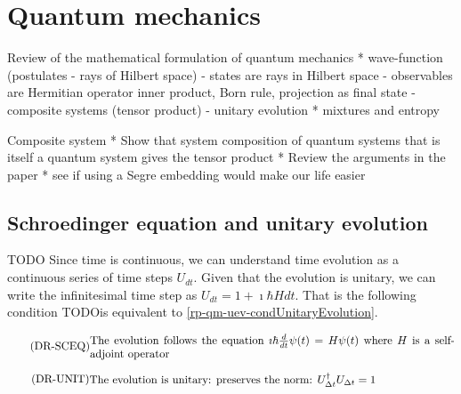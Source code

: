 

\def\>{\rangle}
\def\<{\langle}


\chapter{Quantum mechanics}


Review of the mathematical formulation of quantum mechanics
* wave-function (postulates - rays of Hilbert space)
- states are rays in Hilbert space
- observables are Hermitian operator inner product, Born rule, projection as final state
- composite systems (tensor product)
- unitary evolution
* mixtures and entropy

Composite system
* Show that system composition of quantum systems that is itself a quantum system gives the tensor product
* Review the arguments in the paper
* see if using a Segre embedding would make our life easier

\section{Schroedinger equation and unitary evolution}

TODO Since time is continuous, we can understand time evolution as a continuous series of time steps $U_{dt}$. Given that the evolution is unitary, we can write the infinitesimal time step as $U_{dt} = 1 + \imath \hbar H dt$. That is the following condition
TODOis equivalent to \ref{rp-qm-uev-condUnitaryEvolution}.


\begin{equation}\label{rp-qm-uev-condSchroedingerEq}
	\tag{DR-SCEQ}
	\eqtext{The evolution follows the equation $\imath \hbar \frac{d}{dt} \psi(t) = H \psi(t)$ where $H$ is a self-adjoint operator}
\end{equation}

\begin{equation}\label{rp-qm-uev-condUnitaryEvolution}
	\tag{DR-UNIT}
	\eqtext{The evolution is unitary: preserves the norm: $U^{\dagger}_{\Delta t} U_{\Delta t} = 1$} 
\end{equation}



